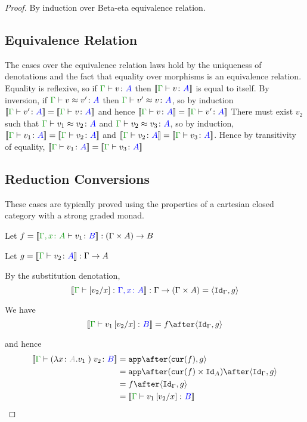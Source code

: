 \documentclass{report}
\begin{document}
\begin{framed}
    
    \begin{proof}
        By induction over Beta-eta equivalence relation.
        \subsection{Equivalence Relation}
        The cases over the equivalence relation laws hold by the uniqueness of denotations and the fact that equality over morphisms is an equivalence relation.
        Equality is reflexive, so if $\gtyperelation{v}{A}$ then $\deno{\gtyperelation{v}{A}}$ is equal to itself.
        By inversion, if $\gberelation{v}{v'}{A}$ then $\gberelation{v'}{v}{A}$, so by induction $\gdenoequality{v'}{v}{A}$ and hence $\gdenoequality{v}{v'}{A}$
        There must exist $v_2$ such that $\gberelation{v_1}{v_2}{A}$ and $\gberelation{v_2}{v_3}{A}$, so by induction,
        $\gdenoequality{v_1}{v_2}{A}$ and $\gdenoequality{v_2}{v_3}{A}$. Hence by transitivity of equality, $\gdenoequality{v_1}{v_3}{A}$
        
        \subsection{Reduction Conversions}
        These cases are typically proved using the properties of a cartesian closed category with a strong graded monad.
        
            Let $f = \deno{\typerelation{\gax}{v_1}{B}}: (\G \times A) \rightarrow B$
        
            Let $g = \deno{\gtyperelation{v_2}{A}}: \G \rightarrow A$
        
            By the substitution denotation, $$\deno{\typerelation{\G}{\ssub{x}{v_2}}{\gax}}: \G \rightarrow (\G \times A) = \pr{\idg}{g}$$
        
            We have $$\deno{\gtyperelation{v_1\ssub{x}{v_2}}{B}} = f \after \pr{\idg}{g}$$
        
            and hence
            \begin{equation}
                \begin{split}
                    \deno{\gtyperelation{\apply{(\lam{x}{A}{v_1})}{v_2}}{B}} & = \app\after\pr{\cur{f}}{g} \\
                    & = \app\after(\cur{f}\times\Id{A})\after\pr{\idg}{g}\\
                    & = f \after \pr{\idg}{g} \\
                    & = \deno{\gtyperelation{v_1\ssub{x}{v_2}}{B}}  
                \end{split}
            \end{equation}
           

\end{proof}
\end{framed}
\end{document}
